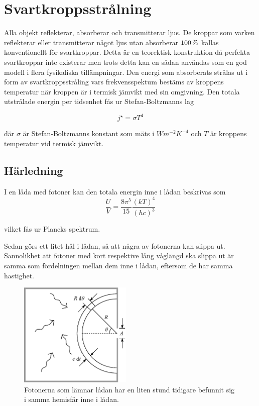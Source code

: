 \section{Svartkroppsstrålning}
\label{sec:blackbody}

Alla objekt reflekterar, absorberar och transmitterar ljus. De kroppar som varken 
reflekterar eller transmitterar något ljus utan absorberar $\unit[100]{\%}$ kallas konventionellt för 
svartkroppar. Detta är en teorektisk konstruktion då perfekta svartkroppar inte existerar 
men trots detta kan en sådan användas som en god modell i flera fysikaliska 
tillämpningar. Den energi som absorberats strålas ut i form av svartkroppsstråling vars 
frekvensspektum bestäms av kroppens temperatur när kroppen är i termisk jämvikt med
 sin omgivning. Den totala utstrålade energin per tidsenhet fås ur Stefan-Boltzmanns lag
 
\begin{equation}
\label{eq:boltzmanslag}
\boxed{ \; \; \;
j^{\star} = \sigma T^{4}
\; \; \; }
\end{equation}

\noindent
där $\sigma$ är Stefan-Boltzmanns konstant som mäts i $\unit{Wm^{-2}K^{-4}}$ och $T$ är kroppens temperatur vid termisk jämvikt.

\subsection{Härledning}
I en låda med fotoner kan den totala energin inne i lådan beskrivas som 
\begin{equation}
\label{eq:photonbox}
\frac{U}{V}=\frac{8\pi^5}{15}\frac{(kT)^4}{(hc)^3}
\end{equation}

vilket fås ur Plancks spektrum.\cite[ss.~301-302]{schroeder00}

Sedan görs ett litet hål i lådan, så att några av fotonerna kan slippa ut. Sannolikhet att fotoner med kort respektive lång våglängd ska slippa ut är samma som fördelningen mellan dem inne i lådan, eftersom de har samma hastighet.

\begin{figure}[hpbt]
\centering
\includegraphics[height=5cm]{images/blackbody_box.eps}
\caption{\label{fig:box}{Fotonerna som lämnar lådan har en liten stund tidigare befunnit sig i samma hemisfär inne i lådan.}}
\end{figure}

